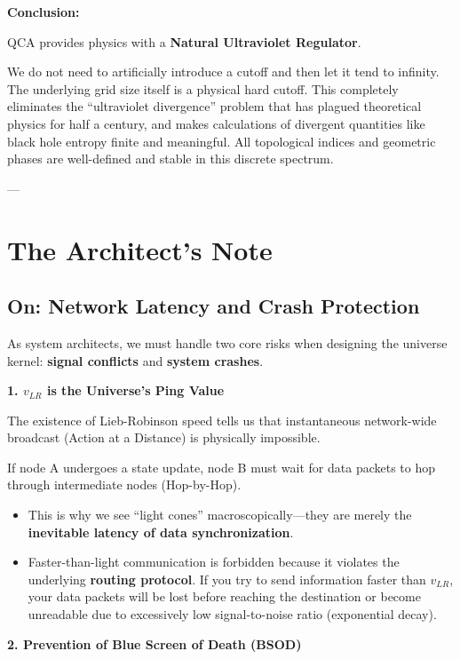 \textbf{Conclusion:}

QCA provides physics with a \textbf{Natural Ultraviolet Regulator}.

We do not need to artificially introduce a cutoff and then let it tend to infinity. The underlying grid size itself is a physical hard cutoff. This completely eliminates the ``ultraviolet divergence'' problem that has plagued theoretical physics for half a century, and makes calculations of divergent quantities like black hole entropy finite and meaningful. All topological indices and geometric phases are well-defined and stable in this discrete spectrum.

---

\section{The Architect's Note}

\subsection{On: Network Latency and Crash Protection}

As system architects, we must handle two core risks when designing the universe kernel: \textbf{signal conflicts} and \textbf{system crashes}.

\textbf{1. $v_{LR}$ is the Universe's Ping Value}

The existence of Lieb-Robinson speed tells us that instantaneous network-wide broadcast (Action at a Distance) is physically impossible.

If node A undergoes a state update, node B must wait for data packets to hop through intermediate nodes (Hop-by-Hop).

\begin{itemize}
\item This is why we see ``light cones'' macroscopically---they are merely the \textbf{inevitable latency of data synchronization}.

\item Faster-than-light communication is forbidden because it violates the underlying \textbf{routing protocol}. If you try to send information faster than \textbf{$v_{LR}$}, your data packets will be lost before reaching the destination or become unreadable due to excessively low signal-to-noise ratio (exponential decay).
\end{itemize}

\textbf{2. Prevention of Blue Screen of Death (BSOD)}

